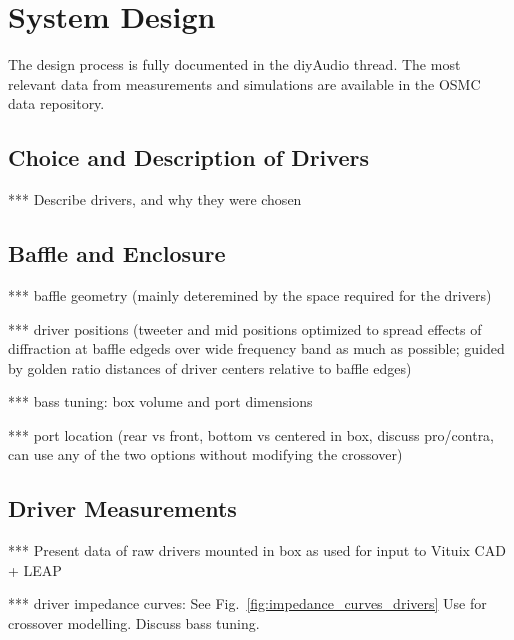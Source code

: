 \documentclass[12pt,a4paper]{article}
\providecommand{\figr}[1]{Fig.~\ref{fig:#1}}
\providecommand{\seclabel}[1]{\label{sec:#1}}
\begin{document}
\section{System Design}

The design process is fully documented in the diyAudio thread. The most relevant data from measurements and simulations are available in the OSMC data repository\cite{osmc_datarepo}.

\subsection{Choice and Description of Drivers}

*** Describe drivers, and why they were chosen


\subsection{Baffle and Enclosure}

*** baffle geometry (mainly deteremined by the space required for the drivers)

*** driver positions (tweeter and mid positions optimized to spread effects of diffraction at baffle edgeds over wide frequency band as much as possible; guided by golden ratio distances of driver centers relative to baffle edges)

*** bass tuning: box volume and port dimensions

*** port location (rear vs front, bottom vs centered in box, discuss pro/contra, can use any of the two options without modifying the crossover)


\subsection{Driver Measurements}\seclabel{driver_measurements}

*** Present data of raw drivers mounted in box as used for input to Vituix CAD + LEAP

*** driver impedance curves:
See \figr{impedance_curves_drivers}
Use for crossover modelling.
Discuss bass tuning.
\end{document}
